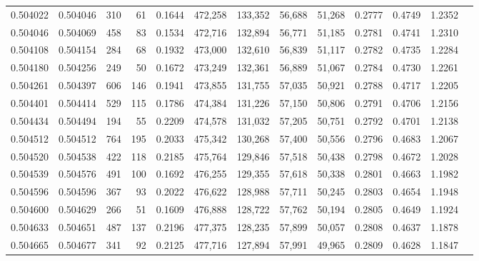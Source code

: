 \begin{tabular}{rrrrrrrrrrrrr}
0.504022 & 0.504046 &   310 &    61 &                                     0.1644 & 472,258 & 133,352 &  56,688 &  51,268 & 0.2777 & 0.4749 & 1.2352 \\
0.504046 & 0.504069 &   458 &    83 &                                     0.1534 & 472,716 & 132,894 &  56,771 &  51,185 & 0.2781 & 0.4741 & 1.2310 \\
0.504108 & 0.504154 &   284 &    68 &                                     0.1932 & 473,000 & 132,610 &  56,839 &  51,117 & 0.2782 & 0.4735 & 1.2284 \\
0.504180 & 0.504256 &   249 &    50 &                                     0.1672 & 473,249 & 132,361 &  56,889 &  51,067 & 0.2784 & 0.4730 & 1.2261 \\
0.504261 & 0.504397 &   606 &   146 &                                     0.1941 & 473,855 & 131,755 &  57,035 &  50,921 & 0.2788 & 0.4717 & 1.2205 \\
0.504401 & 0.504414 &   529 &   115 &                                     0.1786 & 474,384 & 131,226 &  57,150 &  50,806 & 0.2791 & 0.4706 & 1.2156 \\
0.504434 & 0.504494 &   194 &    55 &                                     0.2209 & 474,578 & 131,032 &  57,205 &  50,751 & 0.2792 & 0.4701 & 1.2138 \\
0.504512 & 0.504512 &   764 &   195 &                                     0.2033 & 475,342 & 130,268 &  57,400 &  50,556 & 0.2796 & 0.4683 & 1.2067 \\
0.504520 & 0.504538 &   422 &   118 &                                     0.2185 & 475,764 & 129,846 &  57,518 &  50,438 & 0.2798 & 0.4672 & 1.2028 \\
0.504539 & 0.504576 &   491 &   100 &                                     0.1692 & 476,255 & 129,355 &  57,618 &  50,338 & 0.2801 & 0.4663 & 1.1982 \\
0.504596 & 0.504596 &   367 &    93 &                                     0.2022 & 476,622 & 128,988 &  57,711 &  50,245 & 0.2803 & 0.4654 & 1.1948 \\
0.504600 & 0.504629 &   266 &    51 &                                     0.1609 & 476,888 & 128,722 &  57,762 &  50,194 & 0.2805 & 0.4649 & 1.1924 \\
0.504633 & 0.504651 &   487 &   137 &                                     0.2196 & 477,375 & 128,235 &  57,899 &  50,057 & 0.2808 & 0.4637 & 1.1878 \\
0.504665 & 0.504677 &   341 &    92 &                                     0.2125 & 477,716 & 127,894 &  57,991 &  49,965 & 0.2809 & 0.4628 & 1.1847 \\

\end{tabular}
